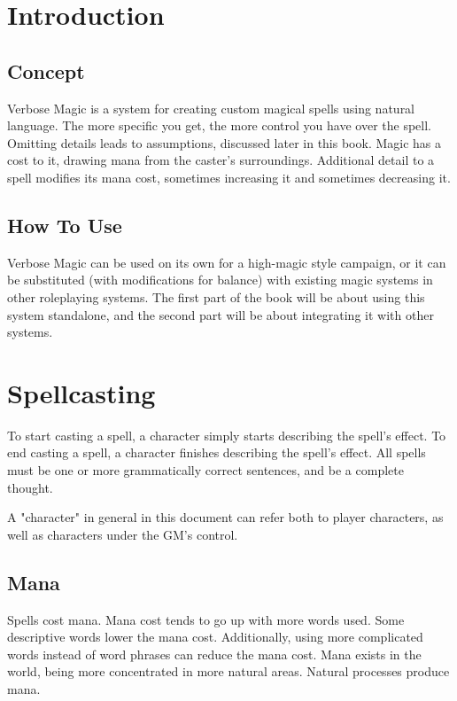 \tableofcontents

\mainmatter

\chapter{Introduction}

\section{Concept}
Verbose Magic is a system for creating custom magical spells using natural language.
The more specific you get, the more control you have over the spell.
Omitting details leads to assumptions, discussed later in this book.
Magic has a cost to it, drawing mana from the caster's surroundings.
Additional detail to a spell modifies its mana cost, sometimes increasing it and sometimes decreasing it.

\section{How To Use}
Verbose Magic can be used on its own for a high-magic style campaign, or it can be substituted (with modifications for balance) with existing magic systems in other roleplaying systems.
The first part of the book will be about using this system standalone, and the second part will be about integrating it with other systems.	

\chapter{Spellcasting}
To start casting a spell, a character simply starts describing the spell's effect.
To end casting a spell, a character finishes describing the spell's effect.
All spells must be one or more grammatically correct sentences, and be a complete thought.

\begin{rpg-commentbox}
	A "character" in general in this document can refer both to player characters, as well as characters under the GM's control.
\end{rpg-commentbox}

\section{Mana}
Spells cost mana.
Mana cost tends to go up with more words used.
Some descriptive words lower the mana cost.
Additionally, using more complicated words instead of word phrases can reduce the mana cost.
Mana exists in the world, being more concentrated in more natural areas.
Natural processes produce mana.

